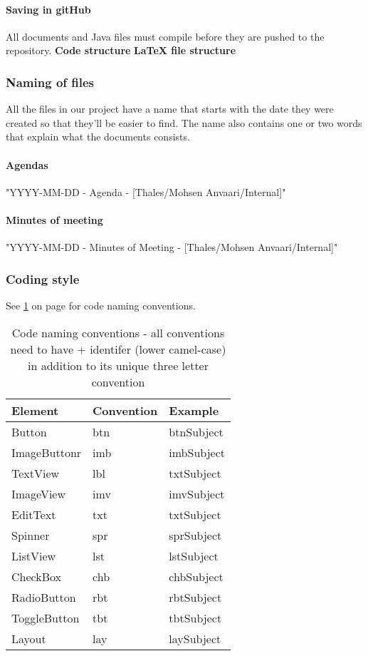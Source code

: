 \paragraph{Saving in gitHub}
All documents and Java files must compile before they are pushed to the repository.
\textbf{Code structure}
\textbf{LaTeX file structure}


\subsubsection{Naming of files}
All the files in our project have a name that starts with the date they were created so that they’ll be easier to find. The name also contains one or two words that explain what the documents consists.

\paragraph{Agendas}\hfill
\newline
"YYYY-MM-DD - Agenda - [Thales/Mohsen Anvaari/Internal]"

\paragraph{Minutes of meeting}\hfill
\newline
"YYYY-MM-DD - Minutes of Meeting - [Thales/Mohsen Anvaari/Internal]"

\subsubsection{Coding style}
See \ref{tab:namingconventions} on page \pageref{tab:namingconventions} for code naming conventions.
\begin{table}
\begin{tabular}{l|l|l}
\textbf{Element} & \textbf{Convention} & \textbf{Example} \\ \hline \hline
Button & btn & btnSubject \\ \hline
ImageButtonr & imb & imbSubject \\ \hline
TextView & lbl & txtSubject \\ \hline
ImageView & imv & imvSubject \\ \hline
EditText & txt & txtSubject \\ \hline
Spinner & spr & sprSubject \\ \hline
ListView & lst & lstSubject \\ \hline
CheckBox & chb & chbSubject \\ \hline
RadioButton & rbt & rbtSubject \\ \hline
ToggleButton & tbt & tbtSubject \\ \hline
Layout & lay & laySubject 
\end{tabular}
\caption{Code naming conventions - all conventions need to have + identifer (lower camel-case) in addition to its unique three letter convention }\label{tab:namingconventions}
\end{table}


